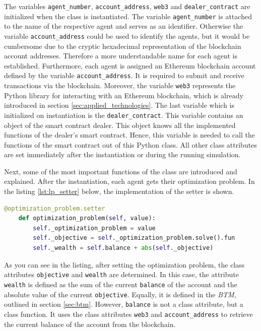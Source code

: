 The variables \verb|agent_number|, \verb|account_address|, \verb|web3| and \verb|dealer_contract| are initialized when the class is instantiated.
The variable \verb|agent_number| is attached to the name of the respective agent and serves as an identifier. 
Otherwise the variable \verb|account_address| could be used to identify the agents, 
but it would be cumbersome due to the cryptic hexadecimal representation of the blockchain account addresses.
Therefore a more understandable name for each agent is established.
Furthermore, each agent is assigned an Ethereum blockchain account defined by the variable \verb|account_address|. It is required to submit and 
receive transactions via the blockchain.
Moreover, the variable \verb|web3| represents the Python library for interacting with an Ethereum blockchain, which is already introduced in section \ref{sec:applied_technologies}.
The last variable which is initialized on instantiation is the \verb|dealer_contract|. 
This variable contains an object of the smart contract dealer. This object knows all the implemented functions of the dealer's smart contract.
Hence, this variable is needed to call the functions of the smart contract out of this Python class.
All other class attributes are set immediately after the instantiation or during the running simulation. 

Next, some of the most important functions of the class are introduced and explained.
After the instantiation, each agent gets their optimization problem. In the listing \ref{lst:lp_setter} below, the implementation 
of the setter is shown.

\begin{lstlisting}[label=lst:lp_setter, caption=Setter of optimization problem, language=Python]
    @optimization_problem.setter
    def optimization_problem(self, value):
        self._optimization_problem = value
        self._objective = self._optimization_problem.solve().fun
        self._wealth = self.balance + abs(self._objective)
\end{lstlisting}

As you can see in the listing, after setting the optimization problem, the class attributes \verb|objective| and \verb|wealth| are determined.
In this case, the attribute \verb|wealth| is defined as the sum of the current \verb|balance| of the account and the absolute value of the current \verb|objective|.
Equally, it is defined in the \textit{BTM}, outlined in section \ref{sec:btm}.
However, \verb|balance| is not a class attribute, but a class function. It uses the class attributes \verb|web3| and \verb|account_address| to retrieve the current
balance of the account from the blockchain.

